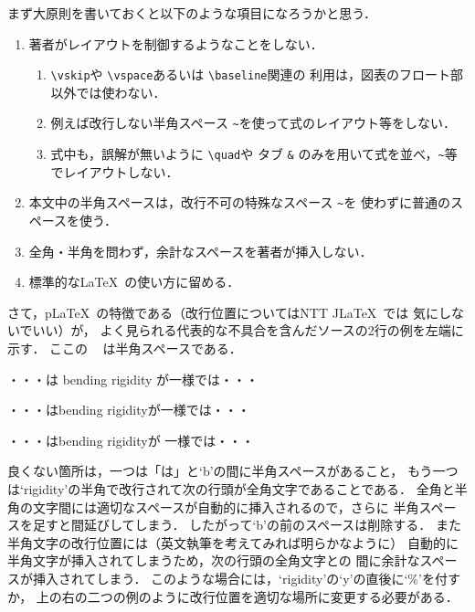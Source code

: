 \documentclass[dvipdfmx,onecolumn]{jsce}  %
\begin{document}
まず大原則を書いておくと以下のような項目になろうかと思う．
\begin{enumerate}
\item 著者がレイアウトを制御するようなことをしない．
\begin{enumerate}
\item \verb+\vskip+や \verb+\vspace+あるいは \verb+\baseline+関連の
利用は，図表のフロート部以外では使わない．
\item 例えば改行しない半角スペース \verb+~+を使って式のレイアウト等をしない．
\item 式中も，誤解が無いように \verb+\quad+や
タブ \verb+&+ のみを用いて式を並べ，\verb+~+等でレイアウトしない．
\end{enumerate}
\item 本文中の半角スペースは，改行不可の特殊なスペース \verb+~+を
使わずに普通のスペースを使う．
\item 全角・半角を問わず，余計なスペースを著者が挿入しない．
\item 標準的な\LaTeX\ の使い方に留める．
\end{enumerate}
さて，p\LaTeX\ の特徴である（改行位置についてはNTT J\LaTeX\ では
気にしないでいい）が，
よく見られる代表的な不具合を含んだソースの2行の例を左端に示す．
ここの \verb*+ + は半角スペースである．
\smallskip

\noindent\mbox{}\hfill
\begin{minipage}[t]{.28\textwidth}
\begin{verbatim*}
・・・は bending rigidity
が一様では・・・
\end{verbatim*}
\end{minipage}
\hfill
\begin{minipage}[t]{.28\textwidth}
\begin{verbatim*}
・・・はbending
   rigidityが一様では・・・
\end{verbatim*}
\end{minipage}
\hfill
\begin{minipage}[t]{.28\textwidth}
\begin{verbatim*}
・・・はbending rigidityが
一様では・・・
\end{verbatim*}
\end{minipage}
\hfill\mbox{}

\medskip
\noindent
良くない箇所は，一つは「は」と`b'の間に半角スペースがあること，
もう一つは`rigidity'の半角で改行されて次の行頭が全角文字であることである．
全角と半角の文字間には適切なスペースが自動的に挿入されるので，さらに
半角スペースを足すと間延びしてしまう．
したがって`b'の前のスペースは削除する．
また半角文字の改行位置には（英文執筆を考えてみれば明らかなように）
自動的に半角文字が挿入されてしまうため，次の行頭の全角文字との
間に余計なスペースが挿入されてしまう．
このような場合には，`rigidity'の`y'の直後に`\%'を付すか，
上の右の二つの例のように改行位置を適切な場所に変更する必要がある．
\end{document}
